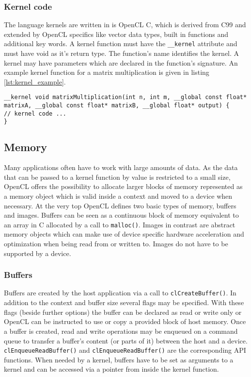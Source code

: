 \subsubsection{Kernel code}
The language kernels are written in is OpenCL C, which is derived from C99 and extended by OpenCL specifics like vector data types, built in functions and additional key words. A kernel function must have the \lstinline!__kernel! attribute and must have void as it's return type. The function's name identifies the kernel. A kernel may have parameters which are declared in the function's signature. An example kernel function for a matrix multiplication is given in listing \ref{lst:kernel_example}.

\begin{lstlisting}[caption={An example of a \lstinline!__kernel! function's signature.},label={lst:kernel_example}]
__kernel void matrixMultiplication(int n, int m, __global const float* matrixA, __global const float* matrixB, __global float* output) {
// kernel code ...
}
\end{lstlisting}

\subsection{Memory}
Many applications often have to work with large amounts of data. As the data that can be passed to a kernel function by value is restricted to a small size, OpenCL offers the possibility to allocate larger blocks of memory represented as a memory object which is valid inside a context and moved to a device when necessary. At the very top OpenCL defines two basic types of memory, buffers and images. Buffers can be seen as a continuous block of memory equivalent to an array in C allocated by a call to \lstinline!malloc()!. Images in contrast are abstract memory objects which can make use of device specific hardware acceleration and optimization when being read from or written to. Images do not have to be supported by a device. \cite[p.23f]{opencl_book}

\subsubsection{Buffers}
Buffers are created by the host application via a call to \lstinline!clCreateBuffer()!. In addition to the context and buffer size several flags may be specified. With these flags (beside further options) the buffer can be declared as read or write only or OpenCL can be instructed to use or copy a provided block of host memory. Once a buffer is created, read and write operations may be enqueued on a command queue to transfer a buffer's content (or parts of it) between the host and a device. \lstinline!clEnqueueReadBuffer()! and \lstinline!clEnqueueReadBuffer()! are the corresponding API functions. When needed by a kernel, buffers have to be set as arguments to a kernel and can be accessed via a pointer from inside the kernel function. \cite[p.24]{opencl_book}

